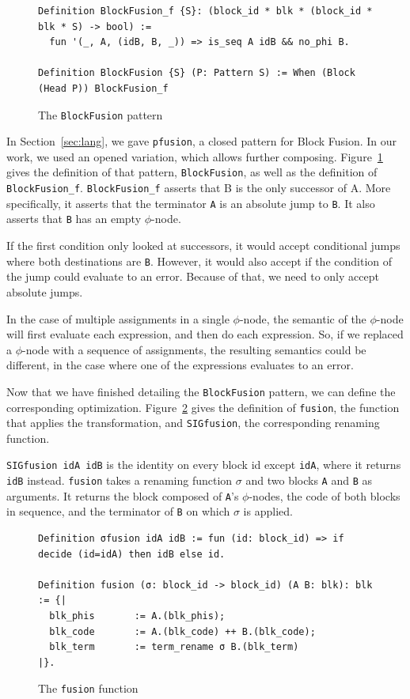 \documentclass[11pt]{article}
\newcommand{\inlinecoq}[1]{\mbox{\lstinline[style=customcoq,columns=fixed,basewidth=.48em]{#1}}}
\newcommand{\ilc}[1]{\inlinecoq{#1}}
\begin{document}
\begin{figure}[h]
  \begin{lstlisting}[style=customcoq,basicstyle=\small\ttfamily]
Definition BlockFusion_f {S}: (block_id * blk * (block_id * blk * S) -> bool) :=
  fun '(_, A, (idB, B, _)) => is_seq A idB && no_phi B.

Definition BlockFusion {S} (P: Pattern S) := When (Block (Head P)) BlockFusion_f
  \end{lstlisting}
  \caption{The \ilc{BlockFusion} pattern}
  \label{fig:bfusion}
\end{figure}

In Section~\ref{sec:lang}, we gave \ilc{pfusion}, a closed pattern for Block Fusion. In our work, we used an opened variation, which allows further composing. Figure~\ref{fig:bfusion} gives the definition of that pattern, \ilc{BlockFusion}, as well as the definition of \ilc{BlockFusion_f}.
%
\ilc{BlockFusion_f} asserts that B is the only successor of A. More specifically, it asserts that the terminator \ilc{A} is an absolute jump to \ilc{B}. It also asserts that \ilc{B} has an empty $\phi$-node.

If the first condition only looked at successors, it would accept conditional jumps where both destinations are \ilc{B}. However, it would also accept if the condition of the jump could evaluate to an error. Because of that, we need to only accept absolute jumps.

In the case of multiple assignments in a single $\phi$-node, the semantic of the $\phi$-node will first evaluate each expression, and then do each expression. So, if we replaced a $\phi$-node with a sequence of assignments, the resulting semantics could be different, in the case where one of the expressions evaluates to an error.

Now that we have finished detailing the \ilc{BlockFusion} pattern, we can define the corresponding optimization. Figure~\ref{fig:fusion} gives the definition of \ilc{fusion}, the function that applies the transformation, and \ilc{SIGfusion}, the corresponding renaming function.

\ilc{SIGfusion idA idB} is the identity on every block id except \ilc{idA}, where it returns \ilc{idB} instead. \ilc{fusion} takes a renaming function $\sigma$ and two blocks \ilc{A} and \ilc{B} as arguments. It returns the block composed of \ilc{A}'s $\phi$-nodes, the code of both blocks in sequence, and the terminator of \ilc{B} on which $\sigma$ is applied.

\begin{figure}
  \begin{lstlisting}[style=customcoq,basicstyle=\small\ttfamily]
Definition σfusion idA idB := fun (id: block_id) => if decide (id=idA) then idB else id.

Definition fusion (σ: block_id -> block_id) (A B: blk): blk := {|
  blk_phis       := A.(blk_phis);
  blk_code       := A.(blk_code) ++ B.(blk_code);
  blk_term       := term_rename σ B.(blk_term)
|}.
  \end{lstlisting}
  \caption{The \ilc{fusion} function}
  \label{fig:fusion}
\end{figure}
\end{document}
